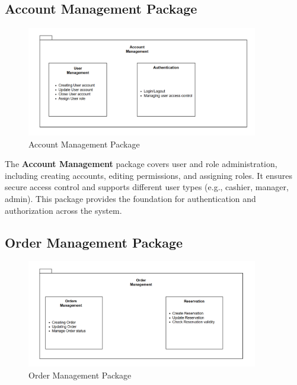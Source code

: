 \documentclass[11pt,a4paper,pdftex]{article}
\begin{document}
\subsection{Account Management Package}

\begin{figure}[H]
    \centering
    \includegraphics[width=0.9\textwidth]{graphics/Package3.png}
    \caption{Account Management Package}
    \label{fig:package3}
\end{figure}

The \textbf{Account Management} package covers user and role administration, including creating accounts, editing permissions, and assigning roles. 
It ensures secure access control and supports different user types (e.g., cashier, manager, admin). 
This package provides the foundation for authentication and authorization across the system.

\subsection{Order Management Package}

\begin{figure}[H]
    \centering
    \includegraphics[width=0.9\textwidth]{graphics/Package4.png}
    \caption{Order Management Package}
    \label{fig:package4}
\end{figure}
\end{document}
